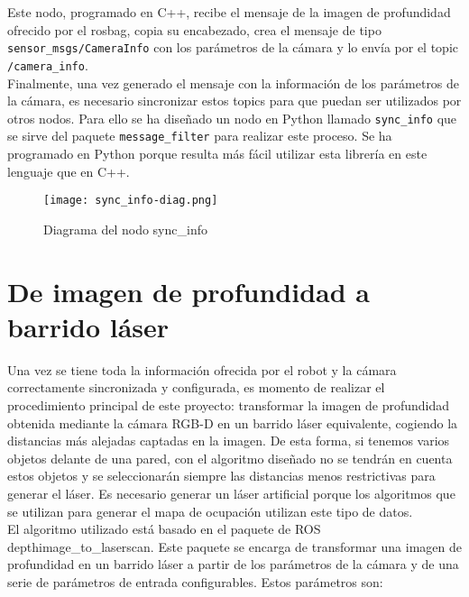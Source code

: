 Este nodo, programado en C++, recibe el mensaje de la imagen de profundidad ofrecido por el rosbag, copia su encabezado, crea el mensaje de tipo \texttt{sensor\_msgs/CameraInfo} con los parámetros de la cámara y lo envía por el topic \texttt{/camera\_info}.\\

Finalmente, una vez generado el mensaje con la información de los parámetros de la cámara, es necesario sincronizar estos topics para que puedan ser utilizados por otros nodos. Para ello se ha diseñado un nodo en Python llamado \texttt{sync\_info} que se sirve del paquete \texttt{message\_filter} para realizar este proceso. Se ha programado en Python porque resulta más fácil utilizar esta librería en este lenguaje que en C++.\\

\begin{figure}[h]
	\begin{center} 
		\texttt{[image: sync\_info-diag.png]}
	\end{center}
	\caption{Diagrama del nodo sync\_info}
	\label{fig:sync_info}
\end{figure}

\section{De imagen de profundidad a barrido láser}

Una vez se tiene toda la información ofrecida por el robot y la cámara correctamente sincronizada y configurada, es momento de realizar el procedimiento principal de este proyecto: transformar la imagen de profundidad obtenida mediante la cámara RGB-D en un barrido láser equivalente, cogiendo la distancias más alejadas captadas en la imagen. De esta forma, si tenemos varios objetos delante de una pared, con el algoritmo diseñado no se tendrán en cuenta estos objetos y se seleccionarán siempre las distancias menos restrictivas para generar el láser. Es necesario generar un láser artificial porque los algoritmos que se utilizan para generar el mapa de ocupación utilizan este tipo de datos.\\

El algoritmo utilizado está basado en el paquete de ROS depthimage\_to\_laserscan. Este paquete se encarga de transformar una imagen de profundidad en un barrido láser a partir de los parámetros de la cámara y de una serie de parámetros de entrada configurables. Estos parámetros son:

